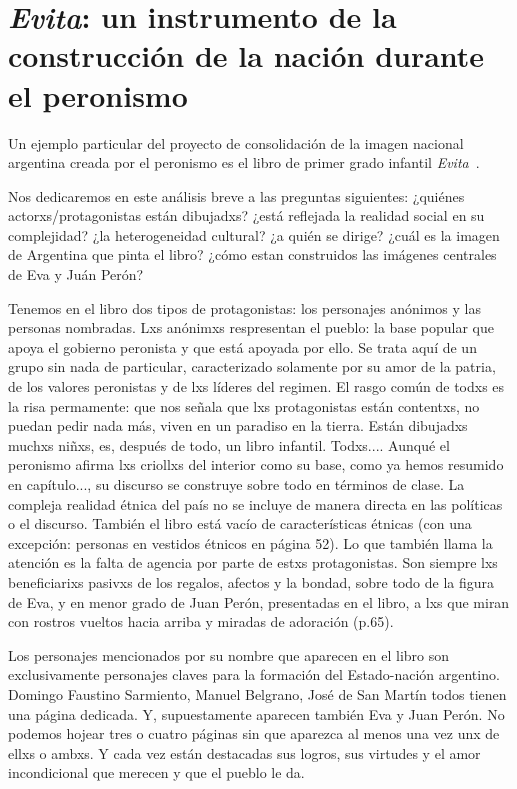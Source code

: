 \section{\textit{Evita}: un instrumento de la construcción de la nación durante el peronismo}

Un ejemplo particular del proyecto de consolidación de la imagen nacional argentina creada por el peronismo es el libro de primer grado infantil \textit{Evita}~\autocite{Albornoz1952}.

Nos dedicaremos en este análisis breve a las preguntas siguientes:
¿quiénes actorxs/protagonistas están dibujadxs?
¿está reflejada la realidad social en su complejidad?
¿la heterogeneidad cultural?
¿a quién se dirige?
¿cuál es la imagen de Argentina que pinta el libro?
¿cómo estan construidos las imágenes centrales de Eva y Juán Perón?

Tenemos en el libro dos tipos de protagonistas: los personajes anónimos y las personas nombradas.
Lxs anónimxs respresentan el pueblo: la base popular que apoya el gobierno peronista y que está apoyada por ello.
Se trata aquí de un grupo sin nada de particular, caracterizado solamente por su amor de la patria, de los valores peronistas y de lxs líderes del regimen.
El rasgo común de todxs es la risa permamente: que nos señala que lxs protagonistas están contentxs, no puedan pedir nada más, viven en un paradiso en la tierra.
Están dibujadxs muchxs niñxs, es, después de todo, un libro infantil.
Todxs....
Aunqué el peronismo afirma lxs criollxs del interior como su base, como ya hemos resumido en capítulo..., su discurso se construye sobre todo en términos de clase.
La compleja realidad étnica del país no se incluye de manera directa en las políticas o el discurso.
También el libro está vacío de características étnicas (con una excepción: personas en vestidos étnicos en página 52).
Lo que también llama la atención es la falta de agencia por parte de estxs protagonistas.
Son siempre lxs beneficiarixs pasivxs de los regalos, afectos y la bondad, sobre todo de la figura de Eva, y en menor grado de Juan Perón, presentadas en el libro, a lxs que miran con rostros vueltos hacia arriba y miradas de adoración (p.65).

Los personajes mencionados por su nombre que aparecen en el libro son exclusivamente personajes claves para la formación del Estado-nación argentino.
Domingo Faustino Sarmiento, Manuel Belgrano, José de San Martín todos tienen una página dedicada.
Y, supuestamente aparecen también Eva y Juan Perón.
No podemos hojear tres o cuatro páginas sin que aparezca al menos una vez unx de ellxs o ambxs.
Y cada vez están destacadas sus logros, sus virtudes y el amor incondicional que merecen y que el pueblo le da.

